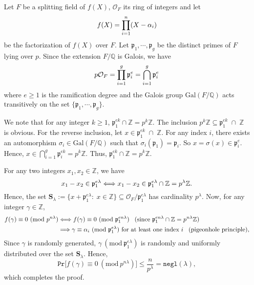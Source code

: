 \documentclass[11pt, lettersize, notitlepage, leqno, footskip=0.6cm]{article}
\newcommand{\bz}{\mathbb Z}
\newcommand{\bq}{\mathbb Q}
\newcommand{\pl}{\prod\limits}
\newcommand{\ttt}{\texttt}
\newcommand{\Gal}{\mathrm{Gal}}
\newcommand{\negl}{\ttt{{negl}}}
\newcommand{\LRA}{\Longleftrightarrow}
\newcommand{\mc}{\mathcal}
\newcommand{\mbf}{\mathbf}
\newcommand{\mfp}{\mathfrak{p}}
\newcommand{\al}{\alpha}
\newcommand{\lam}{\lambda}
\newcommand{\sub}{\subseteq}
\newcommand{\vs}{\vspace{-0.15cm}}
\newcommand{\Mod}[1]{\ (\mathrm{mod}\ #1)}
\numberwithin{equation}{section}
\begin{document}
\begin{prf} Let $F$ be a splitting field of $f(X)$, $\mc{O}_F$ its ring of integers and let \vs $${f}(X) = \pl_{i=1}^n (X-\al_i) \vs $$ be the factorization of ${f}(X)$ over $F$. Let $\mfp_{1},\cdots,\mfp_g$ be the distinct primes of $F$ lying over $p$. Since the extension $F/\bq$ is Galois, we have \vspace{-0.25cm} $$p\mc{O}_F = \pl_{i=1}^{g} \mfp_i^e = \bigcap\limits_{i=1}^{g} \mfp_i^e \vs $$ where $e\geq 1$ is the ramification degree and the Galois group $\Gal(F/\bq)$ acts transitively on the set $\{ \mfp_1,\cdots,\mfp_g\}$.

We note that for any integer $k\geq 1$, $\mfp_1^{ek}\cap \bz = p^{k}\bz$. The inclusion $p^{k}\bz\sub \mfp_1^{ek}\;\cap \;\bz$ is obvious. For the reverse inclusion, let $x\in \mfp_1^{ek}\;\cap\; \bz$. For any index $i$, there exists an automorphism $\sigma_i\in \Gal(F/\bq)$ such that $\sigma_i(\mfp_1) = \mfp_i$. So $x = \sigma(x) \in \mfp_i^e$. Hence, $x\in \bigcap\limits_{i=1}^g \mfp_i^{ek} = p^{k}\bz$. Thus, $\mfp_1^{ek}\cap \bz = p^{k}\bz$.

For any two integers $x_1,x_2\in \bz$, we have \vspace{-0.2cm} $$x_1-x_2\in \mfp_1^{e\lam}\LRA x_1-x_2\in \mfp_1^{e\lam}\cap \bz = p^{\lam}\bz. \vs $$ Hence, the set $ \mbf{S}_{\lam}:= \{x + {\mfp_1^{e\lam}}:\;x\in\bz \}\sub \mc{O}_F/\mfp_1^{e\lam} $ has cardinality $p^{\lam}$. Now, for any integer $\gamma\in \bz$, \vspace{-0.45cm} \begin{align*} \begin{split} f(\gamma)\equiv 0 \Mod{p^{n\lam}} & \LRA f(\gamma)\equiv 0 \Mod{\mfp_1^{en\lam}} \;\;\;(\text{since } \mfp_1^{en\lam}\cap\bz = p^{n\lam}\bz) \\ &\Longrightarrow \gamma\equiv \al_i \Mod{\mfp_1^{e\lam}}\text{ for at least one index } i\;\;\;\hfill (\text{pigeonhole principle}),\end{split} \end{align*} Since $\gamma$ is randomly generated, $\gamma\Mod{\mfp_1^{e\lam}}$ is randomly and uniformly distributed over the set $\mbf{S}_{\lam}$. Hence, \vs $$ \ttt{Pr}\big[ f(\gamma)\equiv 0 \Mod{p^{n\lam}} \big]\leq \frac{n}{p^{\lam}} = \negl(\lam),$$ which completes the proof.\end{prf}
\end{document}
